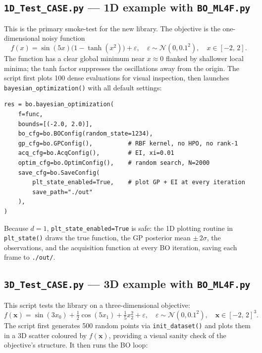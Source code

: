 \documentclass[11pt,a4paper]{article}
\newcommand{\bx}{\bm{x}}
\newcommand{\N}{\mathcal{N}}
\theoremstyle{remark}
\newcommand{\codefile}[1]{\texttt{#1}}
\newcommand{\codefn}[1]{\texttt{#1()}}
\begin{document}
\subsection{\texttt{1D\_Test\_CASE.py} --- 1D example with \codefile{BO\_ML4F.py}}
\label{sec:ex1d}

This is the primary smoke-test for the new library.  The objective is the
one-dimensional noisy function
\begin{equation}
  \label{eq:f1d}
  f(x) = \sin(5x)\bigl(1 - \tanh(x^2)\bigr) + \varepsilon,
  \quad \varepsilon \sim \N(0, 0.1^2),
  \quad x \in [-2,\, 2].
\end{equation}
The function has a clear global minimum near $x \approx 0$ flanked by
shallower local minima; the tanh factor suppresses the oscillations away
from the origin.  The script first plots 100 dense evaluations for visual
inspection, then launches \codefn{bayesian\_optimization} with all default
settings:

\begin{lstlisting}[numbers=none, caption=\codefile{1D\_Test\_CASE.py} --- key call]
res = bo.bayesian_optimization(
    f=func,
    bounds=[(-2.0, 2.0)],
    bo_cfg=bo.BOConfig(random_state=1234),
    gp_cfg=bo.GPConfig(),          # RBF kernel, no HPO, no rank-1
    acq_cfg=bo.AcqConfig(),        # EI, xi=0.01
    optim_cfg=bo.OptimConfig(),    # random search, N=2000
    save_cfg=bo.SaveConfig(
        plt_state_enabled=True,    # plot GP + EI at every iteration
        save_path="./out"
    ),
)
\end{lstlisting}

Because $d=1$, \texttt{plt\_state\_enabled=True} is safe: the 1D plotting
routine in \codefn{plt\_state} draws the true function, the GP posterior
mean $\pm\,2\sigma$, the observations, and the acquisition function at every
BO iteration, saving each frame to \texttt{./out/}.

\subsection{\texttt{3D\_Test\_CASE.py} --- 3D example with \codefile{BO\_ML4F.py}}
\label{sec:ex3d}

This script tests the library on a three-dimensional objective:
\begin{equation}
  \label{eq:f3d}
  f(\bx) = \sin(3x_0) + \tfrac{1}{2}\cos(5x_1) + \tfrac{1}{5}x_2^2 + \varepsilon,
  \quad \varepsilon \sim \N(0, 0.1^2),
  \quad \bx \in [-2,\,2]^3.
\end{equation}
The script first generates 500 random points via \codefn{init\_dataset}
and plots them in a 3D scatter coloured by $f(\bx)$, providing a visual
sanity check of the objective's structure.  It then runs the BO loop:
\end{document}
